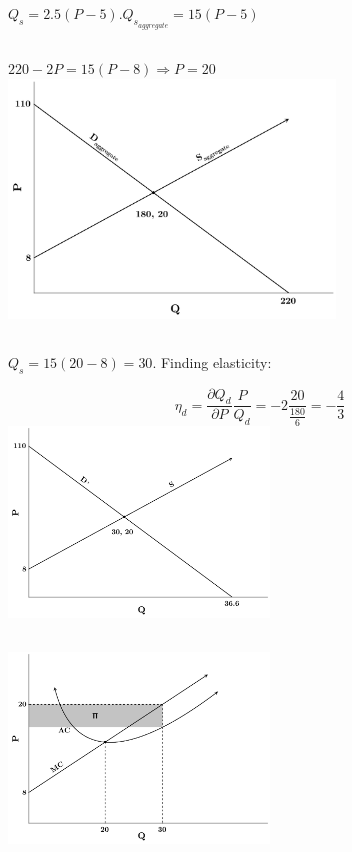 \documentclass{article}
\begin{document}
	\subsection[b]{}
		$ Q_s = 2.5(P-5). Q_{s_{aggregate}} = 15(P-5) $
	\subsection[c]{}
		$ 220-2P = 15(P-8) \Rightarrow P = 20 $\\
		\includegraphics[height=2.5in]{Charts/6c}
	\subsection[d]{}
		$Q_s = 15(20-8) = 30.$ Finding elasticity: 
		
		$$ \eta_d = \frac{\partial Q_d}{\partial P} \frac{P}{Q_d} = -2\frac{20}{\frac{180}{6}} = -\frac{4}{3} $$
		\includegraphics[height=2in]{Charts/6d}
	\subsection[e]{}
		\includegraphics[height=2in]{Charts/6e}
\end{document}
